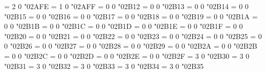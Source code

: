 \Umathchardef\talloblong = 2 0 "02AFE %
\Umathchardef\bigtalloblong = 1 0 "02AFF %
\Umathchardef\squaretopblack = 0 0 "02B12 %
\Umathchardef\squarebotblack = 0 0 "02B13 %
\Umathchardef\squareurblack = 0 0 "02B14 %
\Umathchardef\squarellblack = 0 0 "02B15 %
\Umathchardef\diamondleftblack = 0 0 "02B16 %
\Umathchardef\diamondrightblack = 0 0 "02B17 %
\Umathchardef\diamondtopblack = 0 0 "02B18 %
\Umathchardef\diamondbotblack = 0 0 "02B19 %
\Umathchardef\dottedsquare = 0 0 "02B1A %
\Umathchardef\lgblksquare = 0 0 "02B1B %
\Umathchardef\lgwhtsquare = 0 0 "02B1C %
\Umathchardef\vysmblksquare = 0 0 "02B1D %
\Umathchardef\vysmwhtsquare = 0 0 "02B1E %
\Umathchardef\pentagonblack = 0 0 "02B1F %
\Umathchardef\pentagon = 0 0 "02B20 %
\Umathchardef\varhexagon = 0 0 "02B21 %
\Umathchardef\varhexagonblack = 0 0 "02B22 %
\Umathchardef\hexagonblack = 0 0 "02B23 %
\Umathchardef\lgblkcircle = 0 0 "02B24 %
\Umathchardef\mdblkdiamond = 0 0 "02B25 %
\Umathchardef\mdwhtdiamond = 0 0 "02B26 %
\Umathchardef\mdblklozenge = 0 0 "02B27 %
\Umathchardef\mdwhtlozenge = 0 0 "02B28 %
\Umathchardef\smblkdiamond = 0 0 "02B29 %
\Umathchardef\smblklozenge = 0 0 "02B2A %
\Umathchardef\smwhtlozenge = 0 0 "02B2B %
\Umathchardef\blkhorzoval = 0 0 "02B2C %
\Umathchardef\whthorzoval = 0 0 "02B2D %
\Umathchardef\blkvertoval = 0 0 "02B2E %
\Umathchardef\whtvertoval = 0 0 "02B2F %
\Umathchardef\circleonleftarrow = 3 0 "02B30 %
\Umathchardef\leftthreearrows = 3 0 "02B31 %
\Umathchardef\leftarrowonoplus = 3 0 "02B32 %
\Umathchardef\longleftsquigarrow = 3 0 "02B33 %
\Umathchardef\nvtwoheadleftarrow = 3 0 "02B34 %
\Umathchardef\nVtwoheadleftarrow = 3 0 "02B35 %
